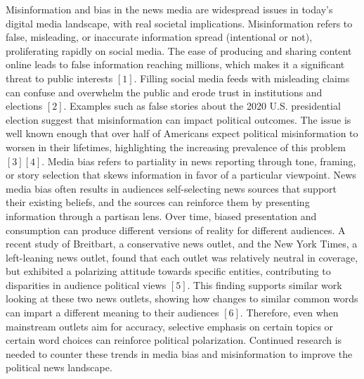 \documentclass[11pt]{article}
\begin{document}
Misinformation and bias in the news media are widespread issues in today's digital media landscape, with real societal implications. Misinformation refers to false, misleading, or inaccurate information spread (intentional or not), proliferating rapidly on social media. The ease of producing and sharing content online leads to false information reaching millions, which makes it a significant threat to public interests \([1]\).
Filling social media feeds with misleading claims can confuse and overwhelm the public and erode trust in institutions and elections \([2]\). Examples such as false stories about the 2020 U.S. presidential election suggest that misinformation can impact political outcomes. The issue is well known enough that over half of Americans expect political misinformation to worsen in their lifetimes, highlighting the increasing prevalence of this problem \([3]\)\([4]\). 
Media bias refers to partiality in news reporting through tone, framing, or story selection that skews information in favor of a particular viewpoint. News media bias often results in audiences self-selecting news sources that support their existing beliefs, and the sources can reinforce them by presenting information through a partisan lens. Over time, biased presentation and consumption can produce different versions of reality for different audiences.
A recent study of Breitbart, a conservative news outlet, and the New York Times, a left-leaning news outlet, found that each outlet was relatively neutral in coverage, but exhibited a polarizing attitude towards specific entities, contributing to disparities in audience political views \([5]\). This finding supports similar work looking at these two news outlets, showing how changes to similar common words can impart a different meaning to their audiences \([6]\). Therefore, even when mainstream outlets aim for accuracy, selective emphasis on certain topics or certain word choices can reinforce political polarization. Continued research is needed to counter these trends in media bias and misinformation to improve the political news landscape.
\end{document}
